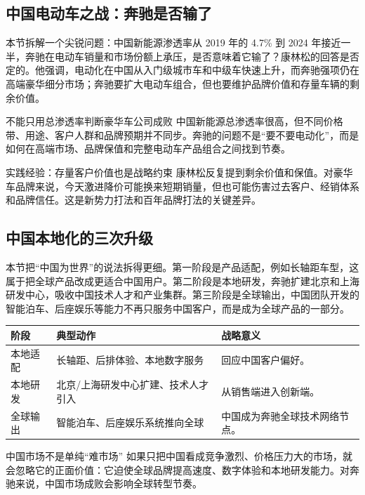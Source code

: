 \subsection{中国电动车之战：奔驰是否输了}

本节拆解一个尖锐问题：中国新能源渗透率从 2019 年的 4.7\% 到 2024 年接近一半，奔驰在电动车销量和市场份额上承压，是否意味着它输了？康林松的回答是否定的。他强调，电动化在中国从入门级城市车和中级车快速上升，而奔驰强项仍在高端豪华细分市场；奔驰要扩大电动车组合，但也要维护品牌价值和存量车辆的剩余价值。

\begin{warningbox}{不能只用总渗透率判断豪华车公司成败}
中国新能源总渗透率很高，但不同价格带、用途、客户人群和品牌预期并不同步。奔驰的问题不是“要不要电动化”，而是如何在高端市场、品牌保值和完整电动车产品组合之间找到节奏。
\end{warningbox}

\begin{importantbox}{实践经验：存量客户价值也是战略约束}
康林松反复提到剩余价值和保值。对豪华车品牌来说，今天激进降价可能换来短期销量，但也可能伤害过去客户、经销体系和品牌信任。这是新势力打法和百年品牌打法的关键差异。
\end{importantbox}

\subsection{中国本地化的三次升级}

本节把“中国为世界”的说法拆得更细。第一阶段是产品适配，例如长轴距车型，这属于把全球产品改成更适合中国用户。第二阶段是本地研发，奔驰扩建北京和上海研发中心，吸收中国技术人才和产业集群。第三阶段是全球输出，中国团队开发的智能泊车、后座娱乐等能力不再只服务中国客户，而是成为全球产品的一部分。

\noindent\begin{tabularx}{\textwidth}{p{}p{}X}
\toprule
阶段 & 典型动作 & 战略意义 \\
\midrule
本地适配 & 长轴距、后排体验、本地数字服务 & 回应中国客户偏好。 \\
本地研发 & 北京/上海研发中心扩建、技术人才引入 & 从销售端进入创新端。 \\
全球输出 & 智能泊车、后座娱乐系统推向全球 & 中国成为奔驰全球技术网络节点。 \\
\bottomrule
\end{tabularx}

\begin{importantbox}{中国市场不是单纯“难市场”}
如果只把中国看成竞争激烈、价格压力大的市场，就会忽略它的正面价值：它迫使全球品牌提高速度、数字体验和本地研发能力。对奔驰来说，中国市场成败会影响全球转型节奏。
\end{importantbox}

